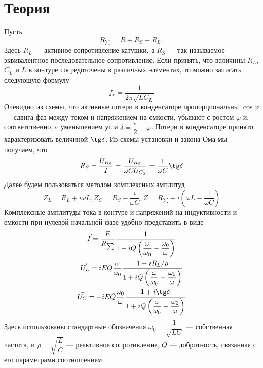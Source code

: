 \documentclass[a4paper, 12pt]{article}%
\begin{document}
\section*{Теория}
Пусть 
\begin{equation}
R_{\sum} = R + R_S + R_L, 
\end{equation}
Здесь $R_L$ --- активное сопротивление катушки, а $R_S$ --- так называемое эквивалентное последовательное сопротивление. 
Если принять, что величины $R_L$, $C_L$ и $L$ в контуре сосредоточены в различных элементах, то можно записать следующую формулу
\begin{equation}
f_r = \dfrac{1}{2\pi \sqrt{LC_L}}
\end{equation}
Очевидно из схемы, что активные потери в конденсаторе пропорциональны $\cos \varphi$ --- сдвига фаз между током и напряжением на емкости, убывают с ростом $\varphi$ и, соответственно, с уменьшением угла $\delta = \dfrac{\pi}{2} - \varphi$. Потери в конденсаторе принято характеризовать величиной $\tg \delta$. Из схемы установки и закона Ома мы получаем, что 
\begin{equation}
R_S = \dfrac{U_{R_S}}{I} = \dfrac{U_{R_S}}{\omega C U_{C_S}} = \dfrac{1}{\omega C}\tg\delta
\end{equation}
Далее будем пользоваться методом комплексных амплитуд 
\begin{equation}
Z_L = R_L + i\omega L, Z_C = R_S - \dfrac{i}{\omega C}, Z = R_{\sum} + i \left(\omega L - \dfrac{1}{\omega C}\right)
\end{equation}
Комплексные амплитуды тока в контуре и напряжений на индуктивности и емкости при нулевой начальной фазе удобно представить в виде 
\begin{equation}
\begin{gathered}
\vec{I} = \dfrac{E}{R_{\sum}} \dfrac{1}{1 + iQ	\left(\dfrac{\omega}{\omega_0} - \dfrac{\omega_0}{\omega} \right)}\\
\vec{U_L} = iEQ \dfrac{\omega}{\omega_0} \dfrac{1 - iR_L/\rho}{1 + iQ\left(\dfrac{\omega}{\omega_0} - \dfrac{\omega_0}{\omega} \right)}\\
\vec{U_C} = -iEQ\dfrac{\omega_0}{\omega} \dfrac{1 + i\tg \delta}{1 + iQ\left(\dfrac{\omega}{\omega_0} - \dfrac{\omega_0}{\omega} \right)}
\end{gathered}
\end{equation}
Здесь использованы стандартные обозначения $\omega_0 = \dfrac{1}{\sqrt{LC}}$ --- собственная частота, и $\rho = \sqrt{\dfrac{L}{C}}$ --- реактивное сопротивление, $Q$ --- добротность, связанная с его параметрами соотношением 
\end{document}
